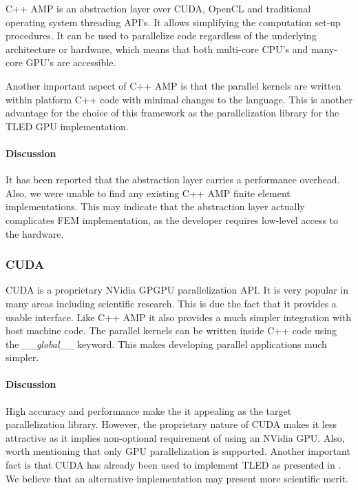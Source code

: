   C++ AMP is an abstraction layer over CUDA, OpenCL and traditional operating system threading API's. It allows simplifying the computation set-up procedures. It can be used to parallelize code regardless of the underlying architecture or hardware, which means that both multi-core CPU's and many-core GPU's are accessible.

  Another important aspect of C++ AMP is that the parallel kernels are written within platform C++ code with minimal changes to the language. This is another advantage for the choice of this framework as the parallelization library for the TLED GPU implementation.

  \paragraph{Discussion} It has been reported \cite{Wong-perf:2010} that the abstraction layer carries a performance overhead. Also, we were unable to find any existing C++ AMP finite element implementations. This may indicate that the abstraction layer actually complicates FEM implementation, as the developer requires low-level access to the hardware.

  \subsubsection{CUDA}

  CUDA is a proprietary NVidia \cite{nvidia-cuda} GPGPU parallelization API. It is very popular in many areas including scientific research. This is due the fact that it provides a usable interface. Like C++ AMP it also provides a much simpler integration with host machine code. The parallel kernels can be written inside C++ code using the \textit{\_\_global\_\_} keyword. This makes developing parallel applications much simpler.

  \paragraph{Discussion}
  High accuracy and performance make the it appealing as the target parallelization library. However, the proprietary nature of CUDA makes it less attractive as it implies non-optional requirement of using an NVidia GPU. Also, worth mentioning that only GPU parallelization is supported. Another important fact is that CUDA has already been used to implement TLED as presented in \cite{Johnsen2014}. We believe that an alternative implementation may present more scientific merit.

